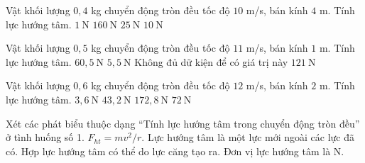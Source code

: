 \begin{ex}
Vật khối lượng $0,4$ kg chuyển động tròn đều tốc độ $10$ m/s, bán kính $4$ m. Tính lực hướng tâm.
\choice
{$1\ \mathrm{N}$}
{$160\ \mathrm{N}$}
{$25\ \mathrm{N}$}
{\True $10\ \mathrm{N}$}
\end{ex}

\begin{ex}
Vật khối lượng $0,5$ kg chuyển động tròn đều tốc độ $11$ m/s, bán kính $1$ m. Tính lực hướng tâm.
\choice
{\True $60,5\ \mathrm{N}$}
{$5,5\ \mathrm{N}$}
{Không đủ dữ kiện để có giá trị này}
{$121\ \mathrm{N}$}
\end{ex}

\begin{ex}
Vật khối lượng $0,6$ kg chuyển động tròn đều tốc độ $12$ m/s, bán kính $2$ m. Tính lực hướng tâm.
\choice
{$3,6\ \mathrm{N}$}
{\True $43,2\ \mathrm{N}$}
{$172,8\ \mathrm{N}$}
{$72\ \mathrm{N}$}
\end{ex}

\begin{ex}
Xét các phát biểu thuộc dạng “Tính lực hướng tâm trong chuyển động tròn đều” ở tình huống số 1.
\choiceTF
{\True $F_{ht}=mv^2/r$.}
{Lực hướng tâm là một lực mới ngoài các lực đã có.}
{\True Hợp lực hướng tâm có thể do lực căng tạo ra.}
{\True Đơn vị lực hướng tâm là N.}
\end{ex}

